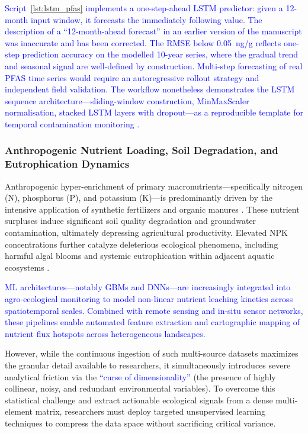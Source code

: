 \documentclass[environments,article,submit,pdftex,moreauthors]{Definitions/mdpi}
\begin{document}
\textcolor{blue}{Script~\ref{lst:lstm_pfas} implements a one-step-ahead LSTM predictor: given a 12-month input window, it forecasts the immediately following value. The description of a ``12-month-ahead forecast'' in an earlier version of the manuscript was inaccurate and has been corrected. The RMSE below 0.05~ng/g reflects one-step prediction accuracy on the modelled 10-year series, where the gradual trend and seasonal signal are well-defined by construction. Multi-step forecasting of real PFAS time series would require an autoregressive rollout strategy and independent field validation. The workflow nonetheless demonstrates the LSTM sequence architecture---sliding-window construction, MinMaxScaler normalisation, stacked LSTM layers with dropout---as a reproducible template for temporal contamination monitoring \cite{Xu2023}.}

\subsubsection{Anthropogenic Nutrient Loading, Soil Degradation, and
    Eutrophication Dynamics}\label{sec2.1.5}

Anthropogenic hyper-enrichment of primary macronutrients---specifically
nitrogen (N), phosphorus (P), and potassium (K)---is predominantly driven by
the intensive application of synthetic fertilizers and organic manures
\cite{Baghaie2020,Luo2017,Hepperly2009}. These nutrient surpluses induce
significant soil quality degradation and groundwater contamination, ultimately
depressing agricultural productivity. Elevated NPK concentrations further
catalyze deleterious ecological phenomena, including harmful algal blooms and
systemic eutrophication within adjacent aquatic ecosystems
\cite{Guan2024,Xu2025}.

\textcolor{blue}{ML architectures---notably GBMs and DNNs---are increasingly integrated into agro-ecological monitoring to model non-linear nutrient leaching kinetics across spatiotemporal scales. Combined with remote sensing and in-situ sensor networks, these pipelines enable automated feature extraction and cartographic mapping of nutrient flux hotspots across heterogeneous landscapes.}

However, while the continuous ingestion of such multi-source datasets maximizes the granular detail available to researchers, it simultaneously introduces severe analytical friction via the \textcolor{blue}{``curse of dimensionality''} (the presence of highly collinear, noisy, and redundant environmental variables). To overcome this statistical challenge and extract actionable ecological signals from a dense multi-element matrix, researchers must deploy targeted unsupervised learning techniques to compress the data space without sacrificing critical variance.
\end{document}
